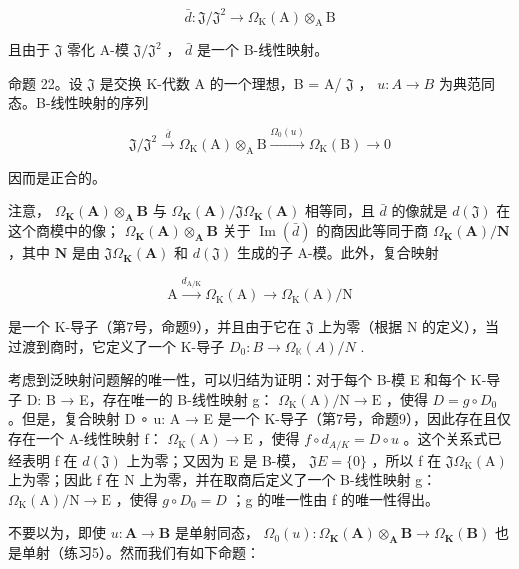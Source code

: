 \[
\bar {d} \colon \mathfrak {J} / \mathfrak {J} ^ {2} \rightarrow \Omega_ {\mathrm{K}} (\mathrm{A}) \otimes_ {\mathrm{A}} \mathrm{B}
\]

且由于 \(\mathfrak{J}\) 零化 A-模 \(\mathfrak{J} / \mathfrak{J}^2\) ， \(\bar{d}\) 是一个 B-线性映射。

命题 22。设 \(\mathfrak{J}\) 是交换 K-代数 A 的一个理想，B = A/ \(\mathfrak{J}\) ， \(u:A\to B\) 为典范同态。B-线性映射的序列

\[
\mathfrak {J} / \mathfrak {J} ^ {2} \xrightarrow {\overline {{d}}} \Omega_ {\mathrm{K}} (\mathrm{A}) \otimes_ {\mathrm{A}} \mathrm{B} \xrightarrow {\Omega_ {0} (u)} \Omega_ {\mathrm{K}} (\mathrm{B}) \to 0\tag{46}
\]

因而是正合的。

注意， \(\Omega_{\mathbf{K}}(\mathbf{A}) \otimes_{\mathbf{A}} \mathbf{B}\) 与 \(\Omega_{\mathbf{K}}(\mathbf{A}) / \mathfrak{J} \Omega_{\mathbf{K}}(\mathbf{A})\) 相等同，且 \(\bar{d}\) 的像就是 \(d(\mathfrak{J})\) 在这个商模中的像； \(\Omega_{\mathbf{K}}(\mathbf{A}) \otimes_{\mathbf{A}} \mathbf{B}\) 关于 \(\operatorname{Im}(\bar{d})\) 的商因此等同于商 \(\Omega_{\mathbf{K}}(\mathbf{A}) / \mathbf{N}\) ，其中 \(\mathbf{N}\) 是由 \(\mathfrak{J} \Omega_{\mathbf{K}}(\mathbf{A})\) 和 \(d(\mathfrak{J})\) 生成的子 A-模。此外，复合映射

\[
\mathrm{A} \xrightarrow {d _ {\mathrm{A} / \mathrm{K}}} \Omega_ {\mathrm{K}} (\mathrm{A}) \longrightarrow \Omega_ {\mathrm{K}} (\mathrm{A}) / \mathrm{N}
\]

是一个 K-导子（第7号，命题9），并且由于它在 \(\mathfrak{J}\) 上为零（根据 N 的定义），当过渡到商时，它定义了一个 K-导子 \(D_0:B\to \Omega_{\mathbb{K}}(A) / N\) .

考虑到泛映射问题解的唯一性，可以归结为证明：对于每个 B-模 E 和每个 K-导子 D: B → E，存在唯一的 B-线性映射 g： \(\Omega_{\mathrm{K}}(\mathrm{A})/\mathrm{N} \rightarrow \mathrm{E}\) ，使得 \(D = g \circ D_{0}\) 。但是，复合映射 D ∘ u: A → E 是一个 K-导子（第7号，命题9），因此存在且仅存在一个 A-线性映射 f： \(\Omega_{\mathrm{K}}(\mathrm{A}) \rightarrow \mathrm{E}\) ，使得 \(f \circ d_{A/K} = D \circ u\) 。这个关系式已经表明 f 在 \(d(\mathfrak{J})\) 上为零；又因为 E 是 B-模， \(\mathfrak{J} E = \{0\}\) ，所以 f 在 \(\mathfrak{J} \Omega_{\mathrm{K}}(\mathrm{A})\) 上为零；因此 f 在 N 上为零，并在取商后定义了一个 B-线性映射 g： \(\Omega_{\mathrm{K}}(\mathrm{A})/\mathrm{N} \rightarrow \mathrm{E}\) ，使得 \(g \circ D_{0} = D\) ；g 的唯一性由 f 的唯一性得出。

不要以为，即使 \(u: \mathbf{A} \to \mathbf{B}\) 是单射同态， \(\Omega_0(u): \Omega_{\mathbf{K}}(\mathbf{A}) \otimes_{\mathbf{A}} \mathbf{B} \to \Omega_{\mathbf{K}}(\mathbf{B})\) 也是单射（练习5）。然而我们有如下命题：


